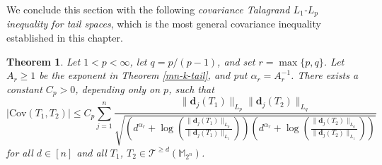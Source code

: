 \documentclass{amsbook}
\newtheorem{theorem}{Theorem}[chapter]
\theoremstyle{definition}
\theoremstyle{remark}
\numberwithin{section}{chapter}
\numberwithin{equation}{chapter}
\newcommand{\1}{\mathbf{1}}
\newcommand{\dc}{\mathbf{d}}
\begin{document}
We conclude this section with the following \emph{covariance Talagrand $L_{1}$-$L_{p}$ inequality for tail spaces}, which is the most general covariance inequality established in this chapter.
\begin{theorem}\label{cov-tala-d-tail-pq}
Let $1<p<\infty$, let $q=p/(p-1)$, and set
$r=\max\{p,q\}$.  Let $A_{r}\geq1$ be the exponent in Theorem
\ref{mn-k-tail}, and put $\alpha_{r}=A_{r}^{-1}$.  There exists a constant
$C_{p}>0$, depending only on $p$, such that
\begin{equation*}\label{cov-tail-pq-estimate}
\big|\mathrm{Cov}(T_{1},T_{2})\big|\leq C_{p}\sum_{j=1}^{n}
\frac{\|\dc_{j}(T_{1})\|_{L_{p}}\|\dc_{j}(T_{2})\|_{L_{q}}}
{\sqrt{\left(d^{\alpha_{r}}+\log\left(\frac{\|\dc_{j}(T_{1})\|_{L_{p}}}{\|\dc_{j}(T_{1})\|_{L_{1}}}\right)\right)\left(d^{\alpha_{r}}+\log\left(\frac{\|\dc_{j}(T_{2})\|_{L_{q}}}{\|\dc_{j}(T_{2})\|_{L_{1}}}\right)\right)}}
\end{equation*}
for all $d\in[n]$ and all $T_{1}$, $T_{2}\in\mathcal{T}^{\geq d}(\mathbb{M}_{2^{n}})$.
\end{theorem}
\end{document}
